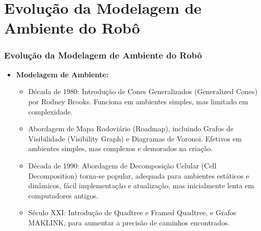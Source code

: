 \documentclass[xcolor=dvipsnames, aspectratio=169]{beamer}
\begin{document}
\section{Evolução da Modelagem de Ambiente do Robô}
\begin{frame}
  \frametitle{Evolução da Modelagem de Ambiente do Robô}
  \begin{itemize}
    \item \textbf{Modelagem de Ambiente:} 
    \begin{itemize}
        \item Década de 1980: Introdução de Cones Generalizados (Generalized Cones) por Rodney Brooks. Funciona em ambientes simples, mas limitado em complexidade.
        \item Abordagem de Mapa Rodoviário (Roadmap), incluindo Grafos de Visibilidade (Visibility Graph) e Diagramas de Voronoi. Efetivos em ambientes simples, mas complexos e demorados na criação.
        \item Década de 1990: Abordagem de Decomposição Celular (Cell Decomposition) torna-se popular, adequada para ambientes estáticos e dinâmicos, fácil implementação e atualização, mas inicialmente lenta em computadores antigos.
        \item Século XXI: Introdução de Quadtree e Framed Quadtree, e Grafos MAKLINK, para aumentar a precisão de caminhos encontrados.
    \end{itemize}

  \end{itemize}
  
\end{frame}


\end{document}
